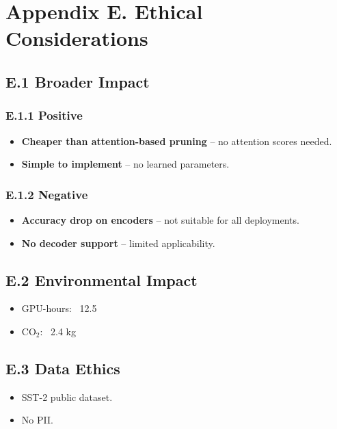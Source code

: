 \section{Appendix E. Ethical Considerations}

\subsection{E.1 Broader Impact}

\subsubsection{E.1.1 Positive}

\begin{itemize}
\item \textbf{Cheaper than attention-based pruning} -- no attention scores needed.
\item \textbf{Simple to implement} -- no learned parameters.

\end{itemize}
\subsubsection{E.1.2 Negative}

\begin{itemize}
\item \textbf{Accuracy drop on encoders} -- not suitable for all deployments.
\item \textbf{No decoder support} -- limited applicability.

\end{itemize}
\subsection{E.2 Environmental Impact}

\begin{itemize}
\item GPU-hours: ~12.5
\item CO$_2$: ~2.4 kg

\end{itemize}
\subsection{E.3 Data Ethics}

\begin{itemize}
\item SST-2 public dataset.
\item No PII.

\end{itemize}
